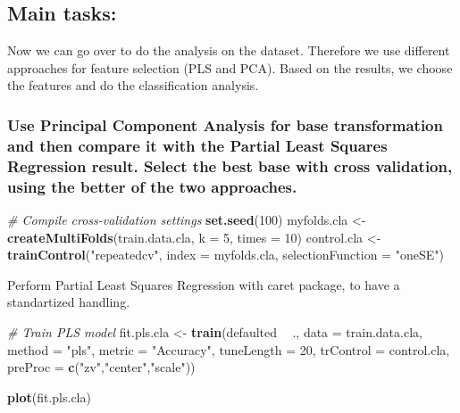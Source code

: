 \documentclass[]{article}
\newenvironment{Shaded}{\begin{snugshade}}{\end{snugshade}}
\newcommand{\CommentTok}[1]{\textcolor[rgb]{0.56,0.35,0.01}{\textit{#1}}}
\newcommand{\DataTypeTok}[1]{\textcolor[rgb]{0.13,0.29,0.53}{#1}}
\newcommand{\DecValTok}[1]{\textcolor[rgb]{0.00,0.00,0.81}{#1}}
\newcommand{\KeywordTok}[1]{\textcolor[rgb]{0.13,0.29,0.53}{\textbf{#1}}}
\newcommand{\NormalTok}[1]{#1}
\newcommand{\OperatorTok}[1]{\textcolor[rgb]{0.81,0.36,0.00}{\textbf{#1}}}
\newcommand{\StringTok}[1]{\textcolor[rgb]{0.31,0.60,0.02}{#1}}
\begin{document}
\hypertarget{main-tasks}{%
\subsection{Main tasks:}\label{main-tasks}}

Now we can go over to do the analysis on the dataset. Therefore we use
different approaches for feature selection (PLS and PCA). Based on the
results, we choose the features and do the classification analysis.

\hypertarget{use-principal-component-analysis-for-base-transformation-and-then-compare-it-with-the-partial-least-squares-regression-result.-select-the-best-base-with-cross-validation-using-the-better-of-the-two-approaches.}{%
\subsubsection{Use Principal Component Analysis for base transformation
and then compare it with the Partial Least Squares Regression result.
Select the best base with cross validation, using the better of the two
approaches.}\label{use-principal-component-analysis-for-base-transformation-and-then-compare-it-with-the-partial-least-squares-regression-result.-select-the-best-base-with-cross-validation-using-the-better-of-the-two-approaches.}}

\begin{Shaded}
\begin{Highlighting}[]
\CommentTok{# Compile cross-validation settings}
\KeywordTok{set.seed}\NormalTok{(}\DecValTok{100}\NormalTok{)}
\NormalTok{myfolds.cla <-}\StringTok{ }\KeywordTok{createMultiFolds}\NormalTok{(train.data.cla, }\DataTypeTok{k =} \DecValTok{5}\NormalTok{, }\DataTypeTok{times =} \DecValTok{10}\NormalTok{)}
\NormalTok{control.cla <-}\StringTok{ }\KeywordTok{trainControl}\NormalTok{(}\StringTok{"repeatedcv"}\NormalTok{, }\DataTypeTok{index =}\NormalTok{ myfolds.cla, }\DataTypeTok{selectionFunction =} \StringTok{"oneSE"}\NormalTok{)}
\end{Highlighting}
\end{Shaded}

Perform Partial Least Squares Regression with caret package, to have a
standartized handling.

\begin{Shaded}
\begin{Highlighting}[]
\CommentTok{# Train PLS model}
\NormalTok{fit.pls.cla <-}\StringTok{ }\KeywordTok{train}\NormalTok{(defaulted }\OperatorTok{~}\StringTok{ }\NormalTok{., }\DataTypeTok{data =}\NormalTok{ train.data.cla,}
 \DataTypeTok{method =} \StringTok{"pls"}\NormalTok{,}
 \DataTypeTok{metric =} \StringTok{"Accuracy"}\NormalTok{,}
 \DataTypeTok{tuneLength =} \DecValTok{20}\NormalTok{,}
 \DataTypeTok{trControl =}\NormalTok{ control.cla,}
 \DataTypeTok{preProc =} \KeywordTok{c}\NormalTok{(}\StringTok{"zv"}\NormalTok{,}\StringTok{"center"}\NormalTok{,}\StringTok{"scale"}\NormalTok{))}

\KeywordTok{plot}\NormalTok{(fit.pls.cla)}
\end{Highlighting}
\end{Shaded}
\end{document}
